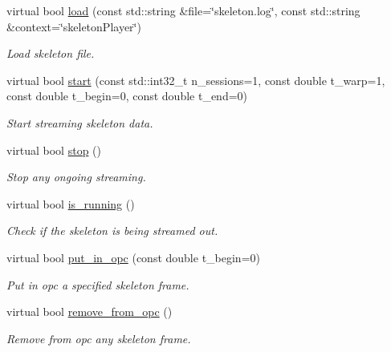 \begin{DoxyCompactItemize}
\item 
virtual bool \mbox{\hyperlink{classskeletonPlayer__IDL_ac34bafdeb8df497435c9c3da9d8dee5b}{load}} (const std\+::string \&file=\char`\"{}skeleton.\+log\char`\"{}, const std\+::string \&context=\char`\"{}skeleton\+Player\char`\"{})
\begin{DoxyCompactList}\small\item\em Load skeleton file. \end{DoxyCompactList}\item 
virtual bool \mbox{\hyperlink{classskeletonPlayer__IDL_a272d9b148696b9ed727c0e6d21894428}{start}} (const std\+::int32\+\_\+t n\+\_\+sessions=1, const double t\+\_\+warp=1, const double t\+\_\+begin=0, const double t\+\_\+end=0)
\begin{DoxyCompactList}\small\item\em Start streaming skeleton data. \end{DoxyCompactList}\item 
virtual bool \mbox{\hyperlink{classskeletonPlayer__IDL_a2214a63ff7aa12a79de5be488afc036a}{stop}} ()
\begin{DoxyCompactList}\small\item\em Stop any ongoing streaming. \end{DoxyCompactList}\item 
virtual bool \mbox{\hyperlink{classskeletonPlayer__IDL_abd0b1247e03f88d2169b0ed943ef91b7}{is\+\_\+running}} ()
\begin{DoxyCompactList}\small\item\em Check if the skeleton is being streamed out. \end{DoxyCompactList}\item 
virtual bool \mbox{\hyperlink{classskeletonPlayer__IDL_a9b02f3ee360ef27a1ec1b3f321fa5ed7}{put\+\_\+in\+\_\+opc}} (const double t\+\_\+begin=0)
\begin{DoxyCompactList}\small\item\em Put in opc a specified skeleton frame. \end{DoxyCompactList}\item 
virtual bool \mbox{\hyperlink{classskeletonPlayer__IDL_a5a8cedc7e51fc4129d1dadef1a7fec64}{remove\+\_\+from\+\_\+opc}} ()
\begin{DoxyCompactList}\small\item\em Remove from opc any skeleton frame. \end{DoxyCompactList}\item 

\end{DoxyCompactItemize}
